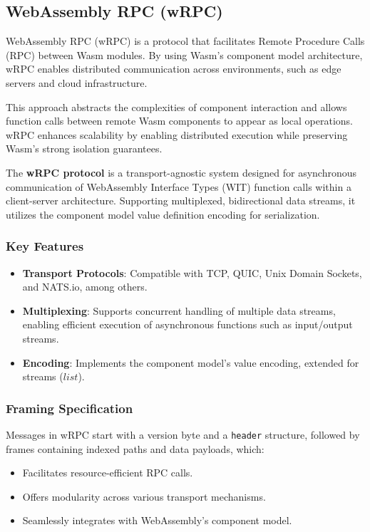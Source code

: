 \subsection{WebAssembly RPC (wRPC)}
WebAssembly RPC (wRPC) is a protocol that facilitates Remote Procedure Calls (RPC) between Wasm modules. By using Wasm's component model architecture, wRPC enables distributed communication across environments, such as edge servers and cloud infrastructure.

This approach abstracts the complexities of component interaction and allows function calls between remote Wasm components to appear as local operations. wRPC enhances scalability by enabling distributed execution while preserving Wasm's strong isolation guarantees.

The \textbf{wRPC protocol} is a transport-agnostic system designed for asynchronous communication of WebAssembly Interface Types (WIT) function calls within a client-server architecture. Supporting multiplexed, bidirectional data streams, it utilizes the component model value definition encoding for serialization.

\subsubsection*{Key Features}
\begin{itemize}
\item \textbf{Transport Protocols}: Compatible with TCP, QUIC, Unix Domain Sockets, and NATS.io, among others.
\item \textbf{Multiplexing}: Supports concurrent handling of multiple data streams, enabling efficient execution of asynchronous functions such as input/output streams.
\item \textbf{Encoding}: Implements the component model's value encoding, extended for streams ($list$).
\end{itemize}

\subsubsection*{Framing Specification}
Messages in wRPC start with a version byte and a \texttt{header} structure, followed by frames containing indexed paths and data payloads, which:

\begin{itemize}
\item Facilitates resource-efficient RPC calls.
\item Offers modularity across various transport mechanisms.
\item Seamlessly integrates with WebAssembly's component model.
\end{itemize}

